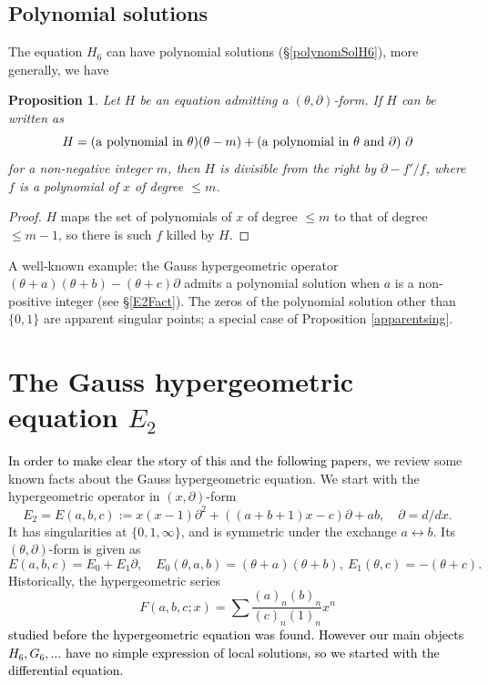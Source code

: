 \documentclass[a4paper,12pt]{article}
\newtheorem{prp}[thm]{Proposition}
\theoremstyle{definition}
\theoremstyle{remark}
\newtheorem{remark}[thm]{Remark}
\numberwithin{equation}{section} %
\newcommand{\blue}[1]{\textcolor{black}{#1}}
\begin{document}
\subsection{Polynomial solutions}
The equation $H_6$ can have polynomial solutions (\S \ref{polynomSolH6}), more generally, we have
\begin{prp}\label{polynomSol}
 Let $H$ be an equation admitting a $(\theta,\partial)$-form. If $H$ can be written as
  $$H=({\rm a\ polynomial\ in\ }\theta)(\theta-m)+({\rm a\ polynomial\ in\ }\theta\ {\rm and}\ \partial)\ \partial$$
  for a non-negative integer $m$, then $H$ is divisible from the right by $\partial-f'/f$, where $f$ is a polynomial of $x$  of degree $\le m$.
\end{prp}
\begin{proof} %
 $H$ maps the set of polynomials of $x$ of degree  $\le m$ to that of degree  $\le m-1$, %
  so there is such $f$ killed by $H$.
  \end{proof} %

\par\noindent
A well-known example: the Gauss hypergeometric operator $(\theta+a)(\theta+b)-(\theta+c)\partial$  admits a polynomial solution when $a$ is a non-positive integer (see \S \ref{E2Fact}).
  The zeros of the polynomial solution other than $\{0,1\}$ are
  apparent singular points; a special case of Proposition \ref{apparentsing}.

\newpage
\section{The Gauss hypergeometric equation $E_2$}\label{E2}
\secttoc
\blue{In order to make clear the story of this and the following papers,} we review some known facts about the Gauss hypergeometric  equation. We start with the hypergeometric operator in $(x,\partial)$-form
  $$E_2=E(a,b,c):=x(x-1)\partial^2+((a+b+1)x-c)\partial +ab,\quad \partial=d/dx.$$
It has singularities at $\{0, 1, \infty\}$, and is symmetric under the exchange $a\leftrightarrow b$. Its $(\theta,\partial)$-form is given as
  $$E(a,b,c)=E_0+E_1\partial,\quad E_0(\theta,a,b)=(\theta+a)(\theta+b),\ E_1(\theta,c)=-(\theta+c).$$
Historically, the hypergeometric series 
  $$F(a,b,c;x)=\sum\frac{(a)_n(b)_n}{(c)_n(1)_n}x^n$$
\blue{studied before the  hypergeometric equation was found. However our main objects $H_6,G_6,\dots$ have no simple expression of local solutions, so we started with the differential equation. } 
\end{document}
